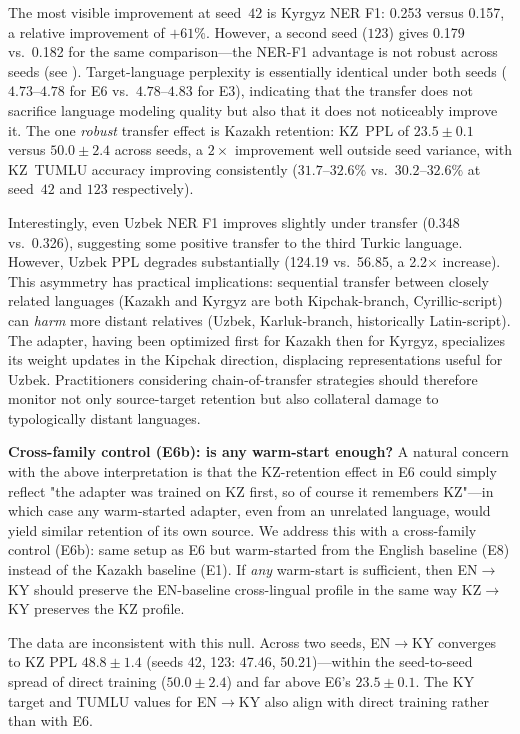 \documentclass[11pt]{article}
\begin{document}
The most visible improvement at seed~$42$ is Kyrgyz NER F1: 0.253 versus 0.157, a relative improvement of $+61\%$. However, a second seed ($123$) gives 0.179 vs.\ 0.182 for the same comparison---the NER-F1 advantage is not robust across seeds (see ). Target-language perplexity is essentially identical under both seeds ($4.73$--$4.78$ for E6 vs.\ $4.78$--$4.83$ for E3), indicating that the transfer does not sacrifice language modeling quality but also that it does not noticeably improve it. The one \emph{robust} transfer effect is Kazakh retention: KZ~PPL of $23.5 \pm 0.1$ versus $50.0 \pm 2.4$ across seeds, a $2\times$ improvement well outside seed variance, with KZ~TUMLU accuracy improving consistently ($31.7$--$32.6\%$ vs.\ $30.2$--$32.6\%$ at seed~$42$ and $123$ respectively).

Interestingly, even Uzbek NER F1 improves slightly under transfer (0.348 vs.\ 0.326), suggesting some positive transfer to the third Turkic language. However, Uzbek PPL degrades substantially (124.19 vs.\ 56.85, a 2.2$\times$ increase). This asymmetry has practical implications: sequential transfer between closely related languages (Kazakh and Kyrgyz are both Kipchak-branch, Cyrillic-script) can \emph{harm} more distant relatives (Uzbek, Karluk-branch, historically Latin-script). The adapter, having been optimized first for Kazakh then for Kyrgyz, specializes its weight updates in the Kipchak direction, displacing representations useful for Uzbek. Practitioners considering chain-of-transfer strategies should therefore monitor not only source-target retention but also collateral damage to typologically distant languages.

\textbf{Cross-family control (E6b): is any warm-start enough?} A natural concern with the above interpretation is that the KZ-retention effect in E6 could simply reflect "the adapter was trained on KZ first, so of course it remembers KZ"---in which case any warm-started adapter, even from an unrelated language, would yield similar retention of its own source. We address this with a cross-family control (E6b): same setup as E6 but warm-started from the English baseline (E8) instead of the Kazakh baseline (E1). If \emph{any} warm-start is sufficient, then EN$\rightarrow$KY should preserve the EN-baseline cross-lingual profile in the same way KZ$\rightarrow$KY preserves the KZ profile.

The data are inconsistent with this null. Across two seeds, EN$\rightarrow$KY converges to KZ PPL $48.8 \pm 1.4$ (seeds 42, 123: 47.46, 50.21)---within the seed-to-seed spread of direct training ($50.0 \pm 2.4$) and far above E6's $23.5 \pm 0.1$. The KY target and TUMLU values for EN$\rightarrow$KY also align with direct training rather than with E6.
\end{document}
